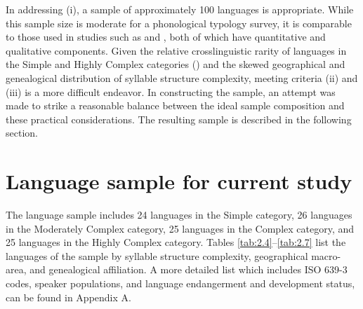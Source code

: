   In addressing (i), a sample of approximately 100 languages is appropriate. While this sample size is moderate for a phonological typology survey, it is comparable to those used in studies such as \citet{Bateman2007} and \citet{BybeeEasterday2019}, both of which have quantitative and qualitative components. Given the relative crosslinguistic rarity of languages in the Simple and Highly Complex categories () and the skewed geographical and genealogical distribution of syllable structure complexity, meeting criteria (ii) and (iii) is a more difficult endeavor. In constructing the sample, an attempt was made to strike a reasonable balance between the ideal sample composition and these practical considerations. The resulting sample is described in the following section.
 
\section{Language sample for current study}\label{sec:2.4}

  The language sample includes 24 languages in the Simple category, 26 languages in the Moderately Complex category, 25 languages in the Complex category, and 25 languages in the Highly Complex category. Tables \ref{tab:2.4}--\ref{tab:2.7} list the languages of the sample by syllable structure complexity, geographical macro-area, and genealogical affiliation. A more detailed list which includes ISO 639-3 codes, speaker populations, and language endangerment and development status, can be found in Appendix A.

